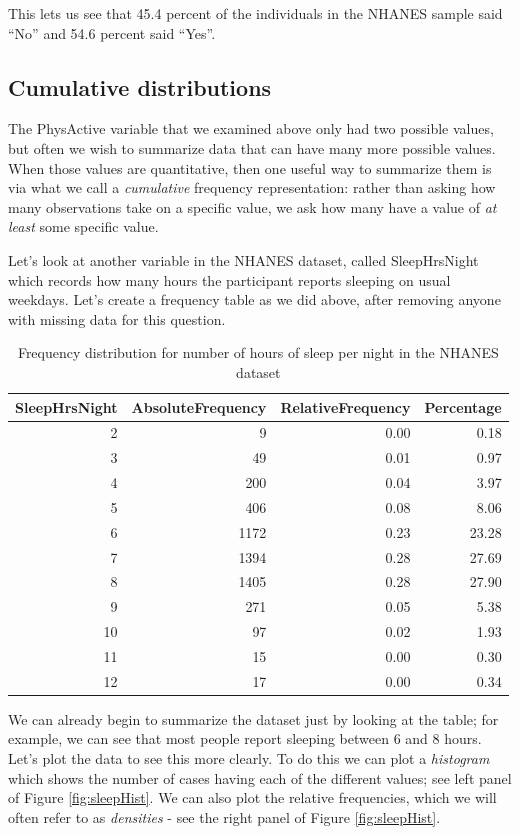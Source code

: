 \documentclass[12pt,]{book}
\theoremstyle{definition}
\theoremstyle{definition}
\theoremstyle{definition}
\theoremstyle{remark}
\begin{document}
This lets us see that 45.4 percent of the individuals in the NHANES sample said ``No'' and 54.6 percent said ``Yes''.

\hypertarget{cumulative-distributions}{%
\subsection{Cumulative distributions}\label{cumulative-distributions}}

The PhysActive variable that we examined above only had two possible values, but often we wish to summarize data that can have many more possible values. When those values are quantitative, then one useful way to summarize them is via what we call a \emph{cumulative} frequency representation: rather than asking how many observations take on a specific value, we ask how many have a value of \emph{at least} some specific value.

Let's look at another variable in the NHANES dataset, called SleepHrsNight which records how many hours the participant reports sleeping on usual weekdays. Let's create a frequency table as we did above, after removing anyone with missing data for this question.

\begin{table}

\caption{\label{tab:unnamed-chunk-7}Frequency distribution for number of hours of sleep per night in the NHANES dataset}
\centering
\begin{tabular}[t]{r|r|r|r}
\hline
SleepHrsNight & AbsoluteFrequency & RelativeFrequency & Percentage\\
\hline
2 & 9 & 0.00 & 0.18\\
\hline
3 & 49 & 0.01 & 0.97\\
\hline
4 & 200 & 0.04 & 3.97\\
\hline
5 & 406 & 0.08 & 8.06\\
\hline
6 & 1172 & 0.23 & 23.28\\
\hline
7 & 1394 & 0.28 & 27.69\\
\hline
8 & 1405 & 0.28 & 27.90\\
\hline
9 & 271 & 0.05 & 5.38\\
\hline
10 & 97 & 0.02 & 1.93\\
\hline
11 & 15 & 0.00 & 0.30\\
\hline
12 & 17 & 0.00 & 0.34\\
\hline
\end{tabular}
\end{table}

We can already begin to summarize the dataset just by looking at the table; for example, we can see that most people report sleeping between 6 and 8 hours. Let's plot the data to see this more clearly. To do this we can plot a \emph{histogram} which shows the number of cases having each of the different values; see left panel of Figure \ref{fig:sleepHist}. We can also plot the relative frequencies, which we will often refer to as \emph{densities} - see the right panel of Figure \ref{fig:sleepHist}.
\end{document}
